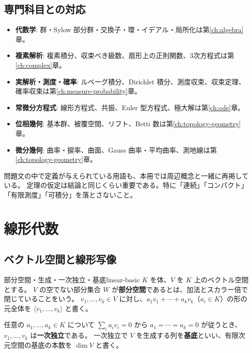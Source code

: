 \section{専門科目との対応}

\begin{itemize}
  \item \textbf{代数学}: 群・Sylow 部分群・交換子・環・イデアル・局所化は第\ref{ch:algebra}章。
  \item \textbf{複素解析}: 複素積分、収束べき級数、扇形上の正則関数、3次方程式は第\ref{ch:complex}章。
  \item \textbf{実解析・測度・確率}: ルベーグ積分、Dirichlet 積分、測度収束、収束定理、確率収束は第\ref{ch:measure-probability}章。
  \item \textbf{常微分方程式}: 線形方程式、共振、Euler 型方程式、極大解は第\ref{ch:ode}章。
  \item \textbf{位相幾何}: 基本群、被覆空間、リフト、Betti 数は第\ref{ch:topology-geometry}章。
  \item \textbf{微分幾何}: 曲率・捩率、曲面、Gauss 曲率・平均曲率、測地線は第\ref{ch:topology-geometry}章。
\end{itemize}

\begin{memo*}
問題文の中で定義が与えられている用語も、本冊では周辺概念と一緒に再掲している。
定理の仮定は結論と同じくらい重要である。特に「連続」「コンパクト」「有限測度」「可積分」を落とさないこと。
\end{memo*}

\chapter{線形代数}
\label{ch:linear-algebra}

\section{ベクトル空間と線形写像}

\begin{definition}{部分空間・生成・一次独立・基底}{linear-basic}
$K$ を体、$V$ を $K$ 上のベクトル空間とする。
$V$ の空でない部分集合 $W$ が\textbf{部分空間}であるとは、加法とスカラー倍で閉じていることをいう。
$v_1,\ldots,v_k\in V$ に対し、$a_1v_1+\cdots+a_kv_k$（$a_i\in K$）の形の元全体を
$\langle v_1,\ldots,v_k\rangle$ と書く。

任意の $a_1,\ldots,a_k\in K$ について $\sum_i a_iv_i=0$ から $a_1=\cdots=a_k=0$ が従うとき、
$v_1,\ldots,v_k$ は\textbf{一次独立}である。
一次独立で $V$ を生成する列を\textbf{基底}といい、有限次元空間の基底の本数を $\dim V$ と書く。
\end{definition}

